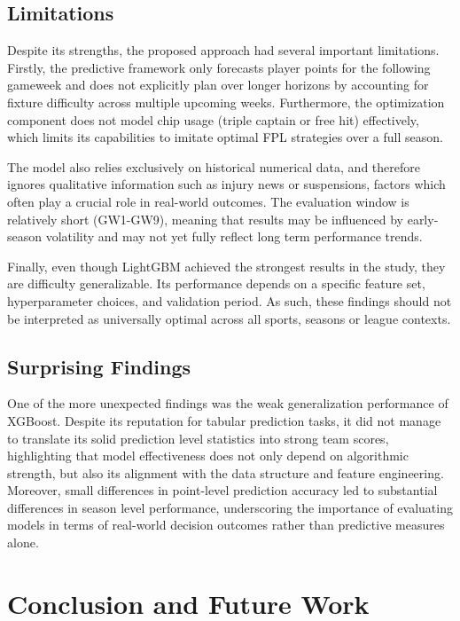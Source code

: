 \documentclass[11pt,a4paper]{article}
\begin{document}
\subsection{Limitations}
Despite its strengths, the proposed approach had several important limitations. Firstly, the predictive framework only forecasts player points for the following gameweek and does not explicitly plan over longer horizons by accounting for fixture difficulty across multiple upcoming weeks. Furthermore, the optimization component does not model chip usage (triple captain or free hit) effectively, which limits its capabilities to imitate optimal FPL strategies over a full season. 

The model also relies exclusively on historical numerical data, and therefore ignores  qualitative information such as injury news or suspensions, factors which often play a crucial role in real-world outcomes. The evaluation window is relatively short (GW1-GW9), meaning that results may be influenced by early-season volatility and may not yet fully reflect long term performance trends. 

Finally, even though LightGBM achieved the strongest results in the study, they are difficulty generalizable. Its performance depends on a specific feature set, hyperparameter choices, and validation period. As such, these findings should not be interpreted as universally optimal across all sports, seasons or league contexts.

\subsection{Surprising Findings}
One of the more unexpected findings was the weak generalization performance of XGBoost. Despite its reputation for tabular prediction tasks, it did not manage to translate its solid prediction level statistics into strong team scores, highlighting that model effectiveness does not only depend on algorithmic strength, but also its alignment with the data structure and feature engineering. Moreover, small differences in point-level prediction accuracy led to substantial differences in season level performance, underscoring the importance of evaluating models in terms of real-world decision outcomes rather than predictive measures alone. 

\section{Conclusion and Future Work}
\label{sec:conclusion}
\end{document}
